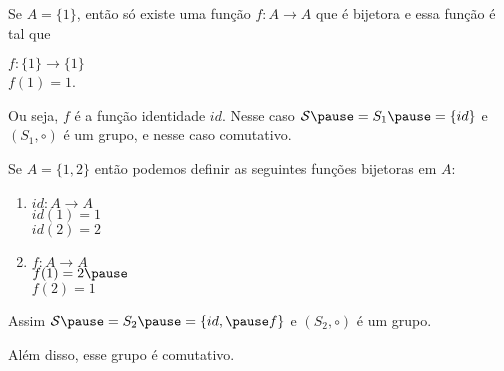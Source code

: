 \documentclass{beamer}
\begin{document}
    \begin{frame}
        Se $A = \{1\}$, \pause então s\'o existe uma função $f : A \to A$ \pause que é bijetora e essa função é tal que \pause
        \begin{center}
            $f : \{1\} \to \{1\}$ \pause\\
            $f(1) = 1$. \pause
        \end{center}
        Ou seja, $f$ é a função identidade $id$. \pause Nesse caso $\mathcal{S} \pause = S_1 \pause = \{id\}$ \pause e $(S_1, \circ)$ é um grupo, \pause e nesse caso comutativo. \pause
    \end{frame}

    \begin{frame}
        Se $A = \{1, 2\}$ \pause então podemos definir as seguintes funç\~oes bijetoras em $A$: \pause
        \begin{multicols}{2}
            \begin{enumerate}
                \item[] \begin{center}
                    $id : A \to A$ \pause\\
                    $id(1) = 1$ \pause\\ $id(2) = 2$
                \end{center}\pause
                \item[]  \begin{center}
                    $f : A \to A$ \pause\\ $f(1) = 2 \pause$\\ $f(2) = 1$
                \end{center}\pause
            \end{enumerate}
        \end{multicols}

        Assim $\mathcal{S} \pause = S_2 \pause = \{id, \pause f\}$ \pause e $(S_2, \circ)$ é um grupo.\pause

        Além disso, esse grupo é comutativo.
    \end{frame}
\end{document}
